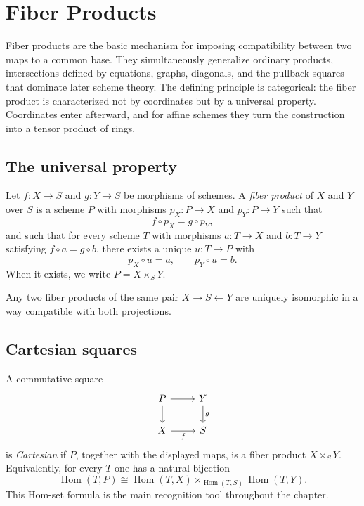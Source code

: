 \chapter{Fiber Products}\label{ch:vi23-fiber-products}

Fiber products are the basic mechanism for imposing compatibility between two maps to a common
base.  They simultaneously generalize ordinary products, intersections defined by equations,
graphs, diagonals, and the pullback squares that dominate later scheme theory.  The defining
principle is categorical: the fiber product is characterized not by coordinates but by a universal
property.  Coordinates enter afterward, and for affine schemes they turn the construction into a
tensor product of rings.

\section{The universal property}
Let $f:X\to S$ and $g:Y\to S$ be morphisms of schemes.  A \emph{fiber product} of $X$ and $Y$
over $S$ is a scheme $P$ with morphisms $p_X:P\to X$ and $p_Y:P\to Y$ such that
\[
 f\circ p_X=g\circ p_Y,
\]
and such that for every scheme $T$ with morphisms $a:T\to X$ and $b:T\to Y$ satisfying
$f\circ a=g\circ b$, there exists a unique $u:T\to P$ with
\[
 p_X\circ u=a,\qquad p_Y\circ u=b.
\]
When it exists, we write $P=X\times_S Y$.

\begin{theorem}\label{thm:vi23-unique}
Any two fiber products of the same pair $X\to S\leftarrow Y$ are uniquely isomorphic in a way
compatible with both projections.
\end{theorem}



\section{Cartesian squares}
A commutative square
\[
\begin{tikzcd}
P \arrow[r] \arrow[d] & Y \arrow[d,"g"]\\
X \arrow[r,"f"'] & S
\end{tikzcd}
\]
is \emph{Cartesian} if $P$, together with the displayed maps, is a fiber product $X\times_S Y$.
Equivalently, for every $T$ one has a natural bijection
\[
\operatorname{Hom}(T,P)
\cong
\operatorname{Hom}(T,X)
\times_{\operatorname{Hom}(T,S)}
\operatorname{Hom}(T,Y).
\]
This Hom-set formula is the main recognition tool throughout the chapter.


